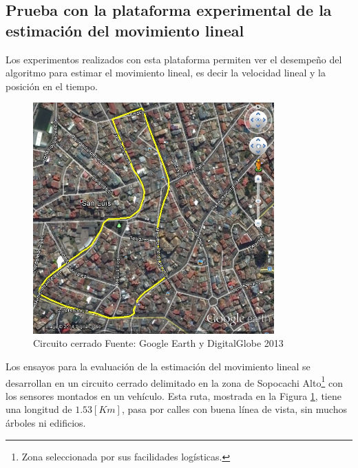 \documentclass[conference]{IEEEtran}
\begin{document}
\subsection{Prueba con la plataforma experimental de la estimación del movimiento lineal}
Los experimentos realizados con esta plataforma permiten ver el desempeño del algoritmo para estimar el movimiento lineal, es decir la velocidad lineal y la posición en el tiempo. \par
\begin{figure}
\begin{center}
\includegraphics[width=25em]
{pruebas_fig1a.jpg}
\caption{Circuito cerrado \scriptsize{Fuente: Google Earth y DigitalGlobe 2013}}
\label{pruebas_fig1}
\end{center}
\end{figure}
Los ensayos para la evaluación de la estimación del movimiento lineal se desarrollan en un circuito cerrado delimitado en la zona de Sopocachi Alto\footnote{Zona seleccionada por sus facilidades logísticas.} con los sensores montados en un vehículo. Esta ruta, mostrada en la Figura \ref{pruebas_fig1}, tiene una longitud de $1.53[Km]$, pasa por calles con buena línea de vista, sin muchos árboles ni edificios.
\end{document}
